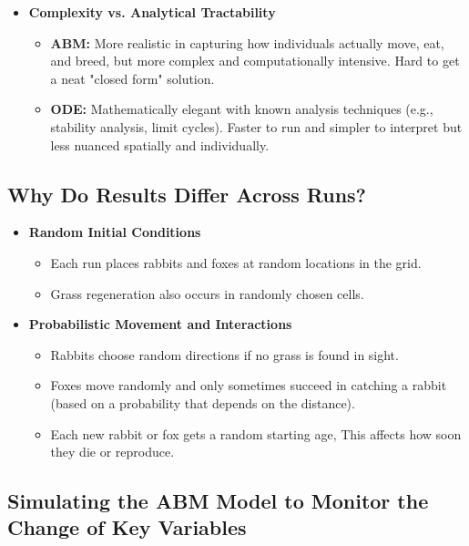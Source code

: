 \begin{itemize}
    \item \textbf{Complexity vs. Analytical Tractability}
    \begin{itemize}
        \item \textbf{ABM:} More realistic in capturing how individuals actually move, eat, and breed, but more complex and computationally intensive. Hard to get a neat "closed form" solution.
        \item \textbf{ODE:} Mathematically elegant with known analysis techniques (e.g., stability analysis, limit cycles). Faster to run and simpler to interpret but less nuanced spatially and individually.
    \end{itemize}
\end{itemize}

\subsection[short]{Why Do Results Differ Across Runs?}

\begin{itemize}
    \item \textbf{Random Initial Conditions}
    \begin{itemize}
        \item Each run places rabbits and foxes at random locations in the grid.
        \item Grass regeneration also occurs in randomly chosen cells.
    \end{itemize}

    \item \textbf{Probabilistic Movement and Interactions}
    \begin{itemize}
        \item Rabbits choose random directions if no grass is found in sight.
        \item Foxes move randomly and only sometimes succeed in catching a rabbit (based on a probability that depends on the distance).
        \item Each new rabbit or fox gets a random starting age, This affects how soon they die or reproduce.
    \end{itemize}

\end{itemize}

\subsection[short]{Simulating the ABM Model to Monitor the Change of Key Variables}